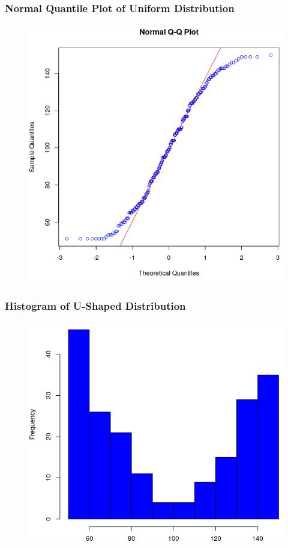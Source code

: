 \documentclass[xcolor=dvipsnames]{beamer}
\begin{document}
\begin{frame}
  \frametitle{Normal Quantile Plot of Uniform Distribution}
\begin{figure}[h]
\includegraphics[scale=.35]{./diagrams/an-unif.png}
\end{figure}
\end{frame}

\begin{frame}
  \frametitle{Histogram of U-Shaped Distribution}
\begin{figure}[h]
\includegraphics[scale=.4]{./diagrams/an-uhist.png}
\end{figure}
\end{frame}
\end{document}

